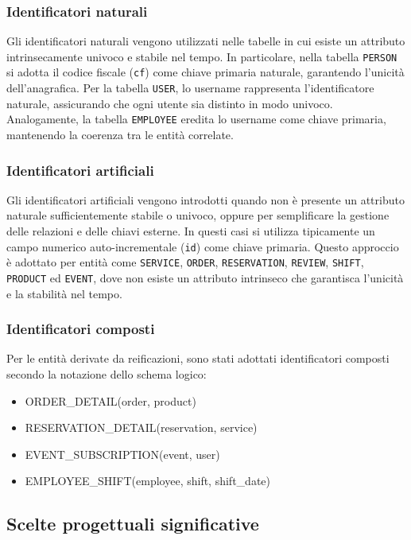 \documentclass[a4paper,12pt]{report}
\begin{document}
\subsubsection{Identificatori naturali}
Gli identificatori naturali vengono utilizzati nelle tabelle in cui
esiste un attributo intrinsecamente univoco e stabile nel tempo. In
particolare, nella tabella \texttt{PERSON} si adotta il codice
fiscale (\texttt{cf}) come chiave primaria naturale, garantendo
l'unicità dell'anagrafica. Per la tabella \texttt{USER}, lo username
rappresenta l'identificatore naturale, assicurando che ogni utente
sia distinto in modo univoco. Analogamente, la tabella
\texttt{EMPLOYEE} eredita lo username come chiave primaria,
mantenendo la coerenza tra le entità correlate.

\subsubsection{Identificatori artificiali}
Gli identificatori artificiali vengono introdotti quando non è
presente un attributo naturale sufficientemente stabile o univoco,
oppure per semplificare la gestione delle relazioni e delle chiavi
esterne. In questi casi si utilizza tipicamente un campo numerico
auto-incrementale (\texttt{id}) come chiave primaria. Questo
approccio è adottato per entità come \texttt{SERVICE}, \texttt{ORDER},
\texttt{RESERVATION}, \texttt{REVIEW}, \texttt{SHIFT}, \texttt{PRODUCT}
ed \texttt{EVENT}, dove non esiste un attributo intrinseco che garantisca
l'unicità e la stabilità nel tempo.

\subsubsection{Identificatori composti}
Per le entità derivate da reificazioni, sono stati adottati
identificatori composti secondo la notazione dello schema logico:

\begin{itemize}
  \item ORDER\_DETAIL(order, product)
  \item RESERVATION\_DETAIL(reservation, service)
  \item EVENT\_SUBSCRIPTION(event, user)
  \item EMPLOYEE\_SHIFT(employee, shift, shift\_date)
\end{itemize}

\subsection{Scelte progettuali significative}
\end{document}
